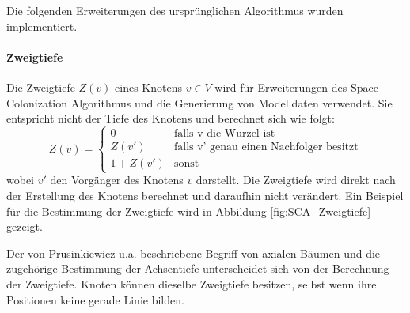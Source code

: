 Die folgenden Erweiterungen des ursprünglichen Algorithmus wurden implementiert.

\paragraph{Zweigtiefe}

Die Zweigtiefe $Z(v)$ eines Knotens $v \in V$ wird für Erweiterungen des Space Colonization Algorithmus und die Generierung von Modelldaten verwendet. Sie entspricht nicht der Tiefe des Knotens und berechnet sich wie folgt:
\begin{equation}
Z(v)= \begin{cases}
0 & \text{falls v die Wurzel ist} \\
Z(v') & \text{falls v' genau einen Nachfolger besitzt}\\
1 + Z(v') & \text{sonst}
\end{cases} 
\end{equation}
wobei $v'$ den Vorgänger des Knotens $v$ darstellt. Die Zweigtiefe wird direkt nach der Erstellung des Knotens berechnet und daraufhin nicht verändert. Ein Beispiel für die Bestimmung der Zweigtiefe wird in Abbildung \ref{fig:SCA_Zweigtiefe} gezeigt.

Der von Prusinkiewicz u.a. \cite{ABOP:04} beschriebene Begriff von axialen Bäumen \cite[S.21]{ABOP:04} und die zugehörige Bestimmung der Achsentiefe unterscheidet sich von der Berechnung der Zweigtiefe. Knoten können dieselbe Zweigtiefe besitzen, selbst wenn ihre Positionen keine gerade Linie bilden.

